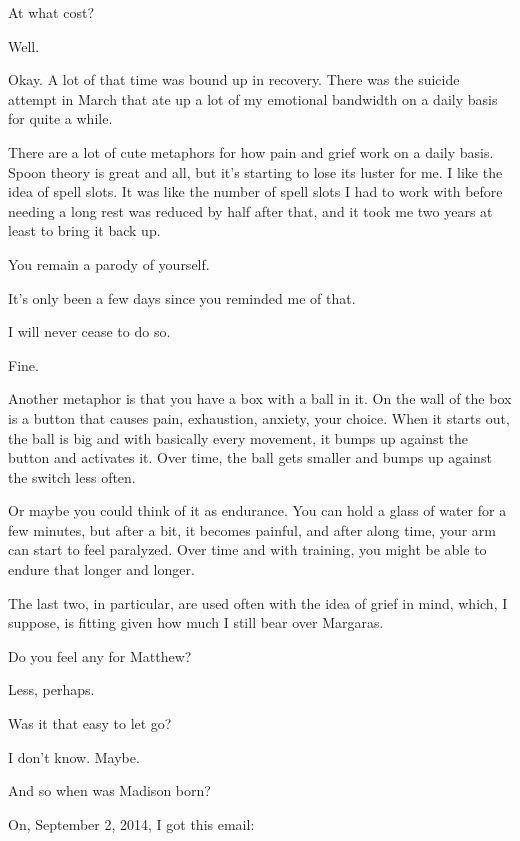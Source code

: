 \begin{paracol}{2}
\begin{leftcolumn}
\begin{ally}
At what cost?
\end{ally}
Well.

Okay. A lot of that time was bound up in recovery. There was the suicide attempt in March that ate up a lot of my emotional bandwidth on a daily basis for quite a while.

There are a lot of cute metaphors for how pain and grief work on a daily basis. Spoon theory is great and all, but it's starting to lose its luster for me. I like the idea of spell slots. It was like the number of spell slots I had to work with before needing a long rest was reduced by half after that, and it took me two years at least to bring it back up.

\begin{ally}
You remain a parody of yourself.
\end{ally}
It's only been a few days since you reminded me of that.

\begin{ally}
I will never cease to do so.
\end{ally}
Fine.

Another metaphor is that you have a box with a ball in it. On the wall of the box is a button that causes pain, exhaustion, anxiety, your choice. When it starts out, the ball is big and with basically every movement, it bumps up against the button and activates it. Over time, the ball gets smaller and bumps up against the switch less often.

Or maybe you could think of it as endurance. You can hold a glass of water for a few minutes, but after a bit, it becomes painful, and after along time, your arm can start to feel paralyzed. Over time and with training, you might be able to endure that longer and longer.

The last two, in particular, are used often with the idea of grief in mind, which, I suppose, is fitting given how much I still bear over Margaras.

\begin{ally}
Do you feel any for Matthew?
\end{ally}
Less, perhaps.

\begin{ally}
Was it that easy to let go?
\end{ally}
I don't know. Maybe.
\newpage

\begin{ally}
And so when was Madison born?
\end{ally}
On, September 2, 2014, I got this email:


\end{leftcolumn}
\end{paracol}
